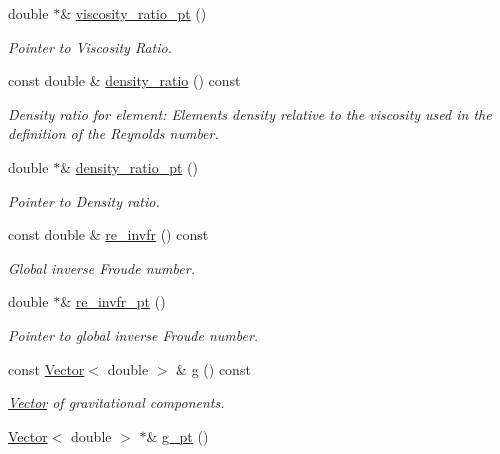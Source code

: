 \begin{DoxyCompactItemize}
double $\ast$\& \hyperlink{classoomph_1_1GeneralisedNewtonianNavierStokesEquations_aba98015b9092c3ac1d52170bac2733f8}{viscosity\+\_\+ratio\+\_\+pt} ()
\begin{DoxyCompactList}\small\item\em Pointer to Viscosity Ratio. \end{DoxyCompactList}\item 
const double \& \hyperlink{classoomph_1_1GeneralisedNewtonianNavierStokesEquations_ad7284d092bbae1657d435dfcba08ab68}{density\+\_\+ratio} () const
\begin{DoxyCompactList}\small\item\em Density ratio for element\+: Element\textquotesingle{}s density relative to the viscosity used in the definition of the Reynolds number. \end{DoxyCompactList}\item 
double $\ast$\& \hyperlink{classoomph_1_1GeneralisedNewtonianNavierStokesEquations_aa856f76a72c762a92c81e8d43f7bd840}{density\+\_\+ratio\+\_\+pt} ()
\begin{DoxyCompactList}\small\item\em Pointer to Density ratio. \end{DoxyCompactList}\item 
const double \& \hyperlink{classoomph_1_1GeneralisedNewtonianNavierStokesEquations_a47027d97882d72c83ee210ac085a92e6}{re\+\_\+invfr} () const
\begin{DoxyCompactList}\small\item\em Global inverse Froude number. \end{DoxyCompactList}\item 
double $\ast$\& \hyperlink{classoomph_1_1GeneralisedNewtonianNavierStokesEquations_a4808b5b9371cfc185d1d477efe328401}{re\+\_\+invfr\+\_\+pt} ()
\begin{DoxyCompactList}\small\item\em Pointer to global inverse Froude number. \end{DoxyCompactList}\item 
const \hyperlink{classoomph_1_1Vector}{Vector}$<$ double $>$ \& \hyperlink{classoomph_1_1GeneralisedNewtonianNavierStokesEquations_a32fe95788a212b0ed24e7466c3b73241}{g} () const
\begin{DoxyCompactList}\small\item\em \hyperlink{classoomph_1_1Vector}{Vector} of gravitational components. \end{DoxyCompactList}\item 
\hyperlink{classoomph_1_1Vector}{Vector}$<$ double $>$ $\ast$\& \hyperlink{classoomph_1_1GeneralisedNewtonianNavierStokesEquations_a27afa462be9900c2e58caaeb69fcefab}{g\+\_\+pt} ()

\end{DoxyCompactItemize}
